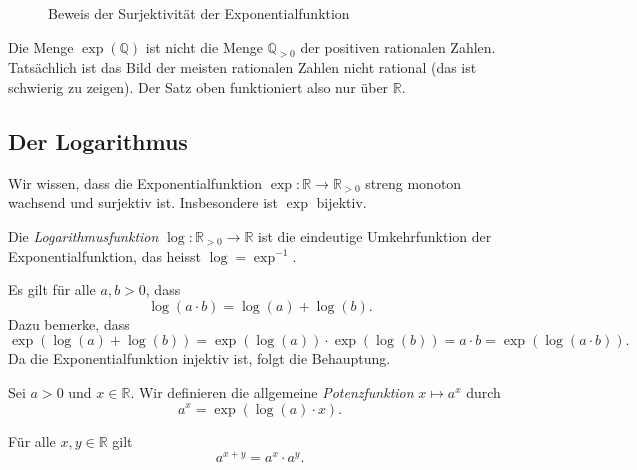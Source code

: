 \documentclass[../main.tex]{subfiles}
\begin{document}
\begin{figure}[htb]
  \centering
  
  \caption{Beweis der Surjektivität der Exponentialfunktion}%
  \label{fig:exp}
\end{figure}


\begin{remark}
  Die Menge $\exp(\mathbb{Q})$ ist nicht die Menge
  $\mathbb{Q}_{>0}$ der positiven rationalen Zahlen.
  Tatsächlich ist das Bild der meisten rationalen Zahlen
  nicht rational (das ist schwierig zu zeigen).
  Der Satz oben funktioniert also nur über $\mathbb{R}$.
\end{remark}

\subsection*{Der Logarithmus}
Wir wissen, dass die Exponentialfunktion
$
  \exp \colon \mathbb{R} \to \mathbb{R}_{>0}
  $
streng monoton wachsend und surjektiv ist.
Insbesondere ist $\exp$ bijektiv.

\begin{definition}
  Die \emph{Logarithmusfunktion}
  $\log \colon \mathbb{R}_{>0} \to \mathbb{R}$ ist die
  eindeutige Umkehrfunktion der Exponentialfunktion,
  das heisst $\log = \exp^{-1}$.
\end{definition}

\begin{remark}
Es gilt für alle $a, b > 0$, dass
\[
  \log(a \cdot b) = \log(a) + \log(b).
\]
Dazu bemerke, dass
\[
  \exp(\log(a) + \log(b)) = 
  \exp(\log(a)) \cdot \exp(\log(b))
  = a \cdot b = \exp(\log(a \cdot b)).
\]
Da die Exponentialfunktion injektiv ist,
folgt die Behauptung.
\end{remark}

\begin{definition}
  Sei $a > 0$ und $x \in \mathbb{R}$. Wir definieren
  die allgemeine \emph{Potenzfunktion}
  $x \mapsto a^x$ durch
  \[
    a^x = \exp(\log(a) \cdot x).
  \]
\end{definition}

\begin{remark}
  Für alle $x, y \in \mathbb{R}$ gilt
  \[
    a^{x+y} = a^{x} \cdot a^{y}.
  \]
\end{remark}
\end{document}
